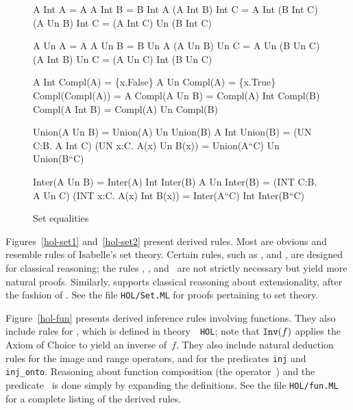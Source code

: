 \begin{figure} \underscoreon   \hfuzz=4pt%
\begin{ttbox}
        A Int A = A
       A Int B = B Int A
         (A Int B) Int C  =  A Int (B Int C)
    (A Un B)  Int C  =  (A Int C) Un (B Int C)

         A Un A = A
        A Un B = B Un A
          (A Un B)  Un C  =  A Un (B Un C)
    (A Int B) Un C  =  (A Un C) Int (B Un C)

    A Int Compl(A) = \{x.False\}
   A Un  Compl(A) = \{x.True\}
 Compl(Compl(A)) = A
          Compl(A Un B)  = Compl(A) Int Compl(B)
         Compl(A Int B) = Compl(A) Un Compl(B)

  Union(A Un B) = Union(A) Un Union(B)
         A Int Union(B) = (UN C:B. A Int C)
    (UN x:C. A(x) Un B(x)) = Union(A``C) Un Union(B``C)

  Inter(A Un B) = Inter(A) Int Inter(B)
          A Un Inter(B) = (INT C:B. A Un C)
   (INT x:C. A(x) Int B(x)) = Inter(A``C) Int Inter(B``C)
\end{ttbox}
\caption{Set equalities} \label{hol-equalities}
\end{figure}


Figures~\ref{hol-set1} and~\ref{hol-set2} present derived rules.  Most are
obvious and resemble rules of Isabelle's {\ZF} set theory.  Certain rules,
such as ,  and ,
are designed for classical reasoning; the rules ,
,  and~ are not
strictly necessary but yield more natural proofs.  Similarly,
 supports classical reasoning about extensionality,
after the fashion of .  See the file {\tt HOL/Set.ML} for
proofs pertaining to set theory.

Figure~\ref{hol-fun} presents derived inference rules involving functions.
They also include rules for , which is defined in theory~{\tt
  HOL}; note that ${\tt Inv}(f)$ applies the Axiom of Choice to yield an
inverse of~$f$.  They also include natural deduction rules for the image
and range operators, and for the predicates {\tt inj} and {\tt inj_onto}.
Reasoning about function composition (the operator~) and the
predicate~ is done simply by expanding the definitions.  See
the file {\tt HOL/fun.ML} for a complete listing of the derived rules.

